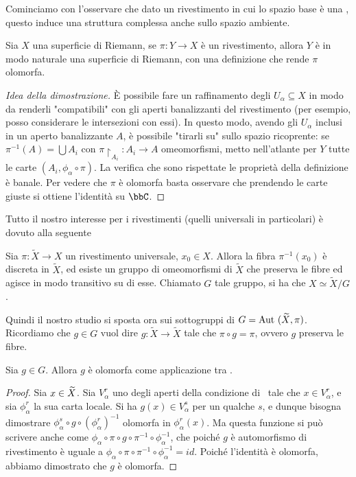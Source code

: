 Cominciamo con l'osservare che dato un rivestimento in cui lo spazio base è una \sdR, questo induce una struttura complessa anche sullo spazio ambiente.
\begin{proposizione}\label{sdr_strut_riv}
Sia $X$ una superficie di Riemann, se $\pi:Y\rightarrow X$ è un rivestimento, allora $Y$ è in modo naturale una superficie di Riemann, con una definizione che rende $\pi$ olomorfa.
\end{proposizione}
\begin{proof}[Idea della dimostrazione]
È possibile fare un raffinamento degli $U_\alpha\subseteq X$ in modo da renderli "compatibili" con gli aperti banalizzanti del rivestimento (per esempio, posso considerare le intersezioni con essi). In questo modo, avendo gli $U_\alpha$ inclusi in un aperto banalizzante $A$, è possibile "tirarli su" sullo spazio ricoprente: se $\pi^{-1}(A)=\bigcup A_i$ con $\pi\restriction_{A_i}:A_i\to A$ omeomorfismi, metto nell'atlante per $Y$ tutte le carte $(A_i,\phi_\alpha\circ\pi)$. La verifica che sono rispettate le proprietà della definizione è banale. Per vedere che $\pi$ è olomorfa basta osservare che prendendo le carte giuste si ottiene l'identità su $\bbC$.
\end{proof}

Tutto il nostro interesse per i rivestimenti (quelli universali in particolari) è dovuto alla seguente
\begin{osservazione}
Sia $\pi:\widetilde{X}\rightarrow X$ un rivestimento universale, $x_0\in X$. Allora la fibra $\pi^{-1}(x_0)$ è discreta in $\widetilde{X}$, ed esiste un gruppo di omeomorfismi di $\widetilde{X}$ che preserva le fibre ed agisce in modo transitivo su di esse. Chiamato $G$ tale gruppo, si ha che $X \simeq \widetilde{X}/G$.
\end{osservazione}

Quindi il nostro studio si sposta ora sui sottogruppi di $G=\text{Aut }(\widetilde X,\pi)$.\\
Ricordiamo che $g\in G$ vuol dire $g:\widetilde X\to\widetilde X$ tale che $\pi\circ g=\pi$, ovvero $g$ preserva le fibre.
\begin{proposizione}
 	Sia $g\in G$. Allora $g$ è olomorfa come applicazione tra \sdR.
\end{proposizione}
\begin{proof}
 	Sia $x\in \widetilde{X}$. Sia $V_\alpha^r$ uno degli aperti della condizione di \sdR\ tale che $x\in V_\alpha^r$, e sia $\phi_\alpha^r$ la sua carta locale. Si ha $g(x)\in V_\alpha^s$ per un qualche $s$, e dunque bisogna dimostrare $\phi_\alpha^s\circ g\circ (\phi_\alpha^r)^{-1}$ olomorfa in $\phi_\alpha^r(x)$. Ma questa funzione si può scrivere anche come $\phi_\alpha\circ\pi\circ g\circ \pi^{-1}\circ \phi_\alpha^{-1}$, che poiché $g$ è automorfismo di rivestimento è uguale a $\phi_\alpha\circ\pi\circ\pi^{-1}\circ\phi_\alpha^{-1}=id$. Poiché l'identità è olomorfa, abbiamo dimostrato che $g$ è olomorfa.
\end{proof}



